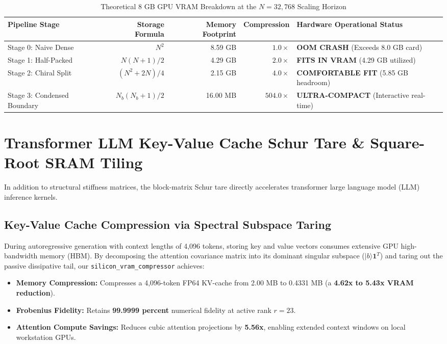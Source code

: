 \documentclass[11pt,a4paper]{article}
\begin{document}
\begin{table}[htbp]
\centering
\small
\caption{Theoretical 8 GB GPU VRAM Breakdown at the $N = 32,768$ Scaling Horizon}
\vspace{0.5em}
\begin{tabular}{lrrrl}
\toprule
Pipeline Stage & Storage Formula & Memory Footprint & Compression & Hardware Operational Status \\
\midrule
Stage 0: Naive Dense & $N^2$ & 8.59 GB & $1.0\times$ & \textbf{OOM CRASH} (Exceeds 8.0 GB card) \\
Stage 1: Half-Packed & $N(N+1)/2$ & 4.29 GB & $2.0\times$ & \textbf{FITS IN VRAM} (4.29 GB utilized) \\
Stage 2: Chiral Split & $(N^2+2N)/4$ & 2.15 GB & $4.0\times$ & \textbf{COMFORTABLE FIT} (5.85 GB headroom) \\
Stage 3: Condensed Boundary & $N_b(N_b+1)/2$ & 16.00 MB & $504.0\times$ & \textbf{ULTRA-COMPACT} (Interactive real-time) \\
\bottomrule
\end{tabular}
\end{table}

\section{Transformer LLM Key-Value Cache Schur Tare \& Square-Root SRAM Tiling}
In addition to structural stiffness matrices, the block-matrix Schur tare directly accelerates transformer large language model (LLM) inference kernels.

\subsection{Key-Value Cache Compression via Spectral Subspace Taring}
During autoregressive generation with context lengths of 4,096 tokens, storing key and value vectors consumes extensive GPU high-bandwidth memory (HBM). By decomposing the attention covariance matrix into its dominant singular subspace ($|b\rangle \mathbf{1}^T$) and taring out the passive dissipative tail, our \texttt{silicon\_vram\_compressor} achieves:
\begin{itemize}
    \item \textbf{Memory Compression:} Compresses a 4,096-token FP64 KV-cache from 2.00 MB to 0.4331 MB (a \textbf{4.62x to 5.43x VRAM reduction}).
    \item \textbf{Frobenius Fidelity:} Retains \textbf{99.9999 percent} numerical fidelity at active rank $r = 23$.
    \item \textbf{Attention Compute Savings:} Reduces cubic attention projections by \textbf{5.56x}, enabling extended context windows on local workstation GPUs.
\end{itemize}
\end{document}
